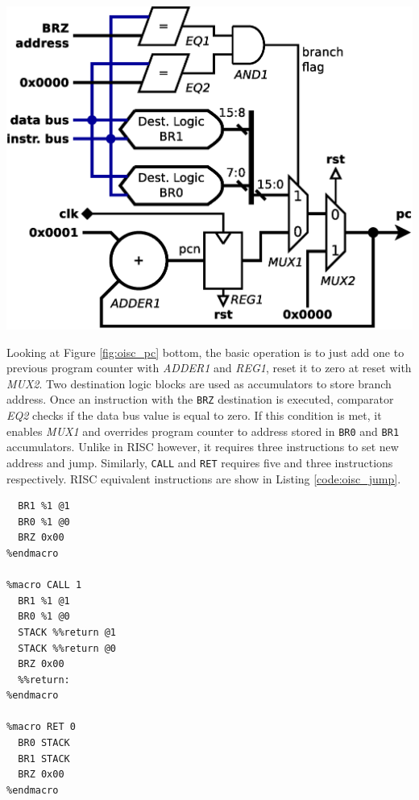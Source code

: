 \begin{colfigure}
	\centering
	\includegraphics[width=\linewidth]{../resources/oisc_pc.eps}
	\label{fig:oisc_pc}
\end{colfigure}

Looking at Figure \ref{fig:oisc_pc} bottom, the basic operation is to just add one to previous program counter with \textit{ADDER1} and \textit{REG1}, reset it to zero at reset with \textit{MUX2}. Two destination logic blocks are used as accumulators to store branch address. Once an instruction with the \texttt{BRZ} destination is executed, comparator \textit{EQ2} checks if the data bus value is equal to zero. If this condition is met, it enables \textit{MUX1} and overrides program counter to address stored in \texttt{BR0} and \texttt{BR1} accumulators. Unlike in RISC however, it requires three instructions to set new address and jump. Similarly, \texttt{CALL} and \texttt{RET} requires five and three instructions respectively. RISC equivalent instructions are show in Listing \ref{code:oisc_jump}.

\begin{blockpage}
	\begin{lstlisting}[frame=single, emph={JUMP, CALL, RET, return}, label=code:oisc_jump, caption={OISC assembly code emulating RISC \texttt{JUMP}, \texttt{CALL} and \texttt{RET} instructions.}]
%macro JUMP 1
  BR1 %1 @1
  BR0 %1 @0
  BRZ 0x00
%endmacro

%macro CALL 1
  BR1 %1 @1
  BR0 %1 @0
  STACK %%return @1
  STACK %%return @0
  BRZ 0x00
  %%return:
%endmacro

%macro RET 0
  BR0 STACK
  BR1 STACK
  BRZ 0x00
%endmacro
	\end{lstlisting}
\end{blockpage}

